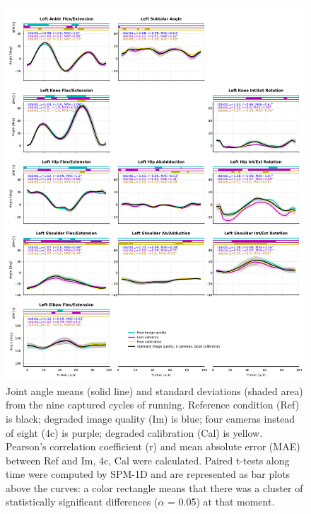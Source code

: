 \begin{figure}[!ht]
	\centering
	\def\svgwidth{1\columnwidth}
	\fontsize{10pt}{10pt}\selectfont
	\includegraphics[height=\dimexpr\textheight-119pt]{"../Annexes/Figures/Fig_RunRobust.png"}
	\caption{Joint angle means (solid line) and standard deviations (shaded area) from the nine captured cycles of running. Reference condition (Ref) is black; degraded image quality (Im) is blue; four cameras instead of eight (4c) is purple; degraded calibration (Cal) is yellow. Pearson’s correlation coefficient (r) and mean absolute error (MAE) between Ref and Im, 4c, Cal were calculated. Paired t-tests along time were computed by SPM-1D and are represented as bar plots above the curves: a color rectangle means that there was a cluster of statistically significant differences (\(\alpha\) = 0.05) at that moment.}
	\label{fig_runrobust}
\end{figure}


